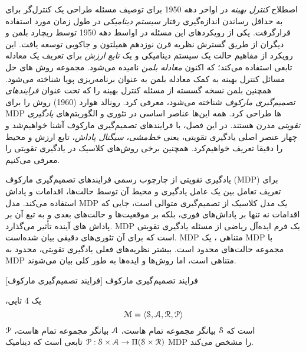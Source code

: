 

اصطلاح \textit{کنترل بهینه}
در اواخر دهه 1950 برای توصیف مسئله طراحی یک کنترل‌گر برای به حداقل رساندن اندازه‌گیری رفتار \textit{سیستم دینامیکی} در طول زمان مورد استفاده قرارگرفت. یکی از رویکردهای این مسئله در اواسط دهه 1950 توسط ریچارد بلمن و دیگران از طریق گسترش نظریه قرن نوزدهم همیلتون و جاکوبی توسعه یافت. این رویکرد از مفاهیم حالت یک سیستم دینامیکی و یک \textit{تابع ارزش} برای تعریف یک معادله تابعی استفاده می‌کند؛ که اکنون \textit{معادله بلمن} نامیده می‌شود. مجموعه روش های حل مسائل کنترل بهینه به کمک معادله بلمن به عنوان برنامه‌ریزی پویا شناخته می‌شود. همچنین بلمن نسخه گسسته از مسئله کنترل بهینه را که تحت عنوان \textit{فرایندهای تصمیم‌گیری مارکوف} 
 شناخته می‌شود، معرفی کرد. رونالد هوارد (1960) روش
  را برای MDP ها طراحی کرد. همه این‌ها عناصر اساسی در تئوری و الگوریتم‌های \textit{یادگیری تقویتی} مدرن هستند.
  در این فصل، با فرایندهای تصمیم‌گیری مارکوف آشنا خواهیم‌شد و چهار عنصر اصلی یادگیری تقویتی، یعنی \textit{خط‌مشی}، \textit{سیگنال پاداش}، تابع ارزش و محیط را دقیقا تعریف خواهیم‌کرد. همچنین برخی روش‌های کلاسیک در یادگیری تقویتی را معرفی می‌کنیم.




یادگیری تقویتی از چارچوب رسمی فرایندهای تصمیم‌گیری مارکوف (MDP) برای تعریف تعامل بین یک عامل یادگیری و محیط آن توسط حالت‌ها، اقدامات و پاداش استفاده می‌کند. مدل MDP یک مدل کلاسیک از تصمیم‌گیری متوالی است، جایی که اقدامات نه تنها بر پاداش‌های فوری، بلکه بر موقعیت‌ها و حالت‌های بعدی و به تبع آن بر پاداش های آینده تأثیر می‌گذارد.
MDP
 یک فرم ایده‌آل ریاضی از مسئله یادگیری تقویتی است که برای آن تئوری‌های دقیقی بیان شده‌است.
MDP متناهی ، یک MDP با مجموعه حالت‌های محدود است. 
بیشتر نظریه‌های فعلی یادگیری تقویتی، محدود به MDP متناهی است، اما روش‌ها و ایده‌ها به طور کلی بیان می‌شوند.


[فرایند تصمیم‌گیری مارکوف] 
 فرایند تصمیم‌گیری مارکوف

،یک 4 تایی 
$$\EuScript{M} = \left< \EuScript{S},\EuScript{A},\EuScript{R},\EuScript{P} \right>$$
است که
 $\EuScript{S}$ بیانگر مجموعه تمام \nf هاست،
 $\EuScript{A}$ بیانگر مجموعه تمام \nf هاست،
$\EuScript{P}$
$ \EuScript{P}: \EuScript{S} \times \EuScript{A} \to \Pi(\EuScript{S} \times \EuScript{R})$
تابعی است که دینامیک MDP را مشخص می‌کند.

